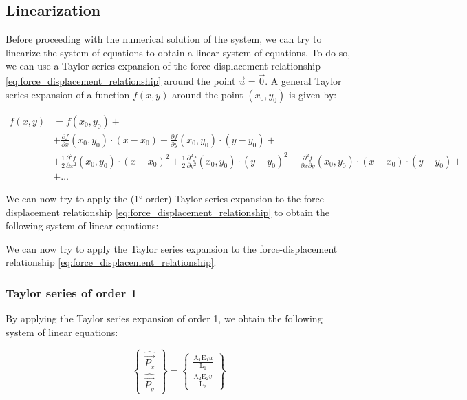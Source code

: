 \subsection{Linearization}

Before proceeding with the numerical solution of the system, we can try to linearize the system of equations to obtain a linear system of equations.
To do so, we can use a Taylor series expansion of the force-displacement relationship \ref{eq:force_displacement_relationship} around the point $\vec{u} = \vec{0}$.
A general Taylor series expansion of a function $f(x, y)$ around the point $(x_0, y_0)$ is given by:

\begin{align}
    f(x, y) & = f(x_0, y_0) + \nonumber                                                                                                                                                                                                                                  \\
            & + \frac{\partial f}{\partial x}(x_0, y_0) \cdot (x - x_0) + \frac{\partial f}{\partial y}(x_0, y_0) \cdot (y - y_0) + \nonumber                                                                                                                            \\
            & + \frac{1}{2} \frac{\partial^2 f}{\partial x^2}(x_0, y_0) \cdot (x - x_0)^2 + \frac{1}{2} \frac{\partial^2 f}{\partial y^2}(x_0, y_0) \cdot (y - y_0)^2 + \frac{\partial^2 f}{\partial x \partial y}(x_0, y_0) \cdot (x - x_0) \cdot (y - y_0) + \nonumber \\
            & + \dots
\end{align}

We can now try to apply the (1° order) Taylor series expansion to the force-displacement relationship \ref{eq:force_displacement_relationship} to obtain the following system of linear equations:

We can now try to apply the Taylor series expansion to the force-displacement relationship \ref{eq:force_displacement_relationship}.


\subsubsection{Taylor series of order 1}

By applying the Taylor series expansion of order 1, we obtain the following system of linear equations:

\begin{equation}
    \begin{Bmatrix}
        \widehat{\vec{P_x}} \\
        \widehat{\vec{P_y}}
    \end{Bmatrix}
    =
    \begin{Bmatrix}
        \frac{\text{A}_1 \text{E}_1 u}{\text{L}_1} \\
        \frac{\text{A}_2 \text{E}_2 v}{\text{L}_2}
    \end{Bmatrix}
\end{equation}


